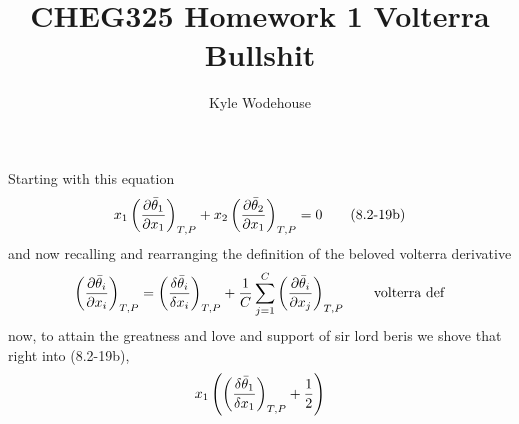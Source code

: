 \documentclass{article}
\title{\bfseries CHEG325 Homework 1 Volterra Bullshit}
\author{Kyle Wodehouse}
\date{}
\begin{document}
\maketitle
\noindent
Starting with this equation
\[ x_1 \left( \frac{\partial \bar\theta_1}{\partial x_1} \right)_{T,P} + x_2 \left( \frac{\partial \bar\theta_2}{\partial x_1} \right)_{T,P} = 0 \tag{8.2-19b} \]
and now recalling and rearranging the definition of the beloved volterra derivative
\[ \p{\bar\theta_i}{x_i}{T,P} = \volterra{\bar\theta_i}{x_i}{T,P} + \frac{1}{C} \sum_{j=1}^{C} \p{\bar\theta_i}{x_j}{T,P} \tag*{\text{volterra def}}\]
now, to attain the greatness and love and support of sir lord beris we shove that right into (8.2-19b),
\[ x_1 \left( \left( \frac{\delta \bar\theta_1}{\delta x_1} \right)_{T,P} + \frac{1}{2}   \right) \]
\end{document}
